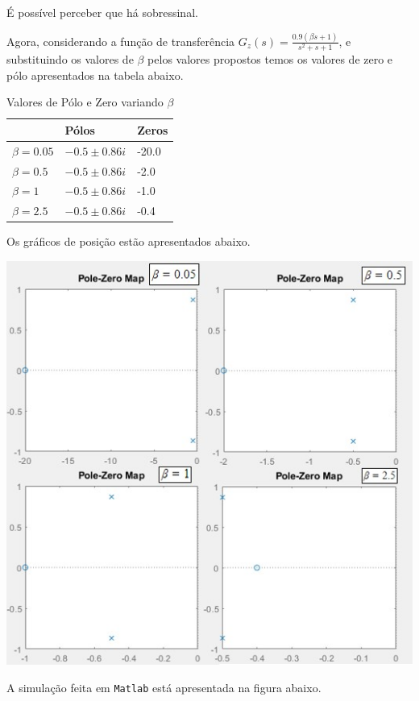 \documentclass[
]{book}
\begin{document}
É possível perceber que há sobressinal.

Agora, considerando a função de transferência \(G_z(s) = \frac {0.9(\beta s+1)}{s^2+s+1}\), e substituindo os valores de \(\beta\) pelos valores propostos temos os valores de zero e pólo apresentados na tabela abaixo.

\begin{table}

\caption{\label{tab:unnamed-chunk-7}Valores de Pólo e Zero variando $\beta$}
\centering
\begin{tabular}[t]{lll}
\toprule
  & Pólos & Zeros\\
\midrule
$\beta = 0.05$ & {$-0.5 \pm 0.86i$} & -20.0\\
$\beta = 0.5$ & {$-0.5 \pm 0.86i$} & -2.0\\
$\beta = 1$ & {$-0.5 \pm 0.86i$} & -1.0\\
$\beta = 2.5$ & {$-0.5 \pm 0.86i$} & -0.4\\
\bottomrule
\end{tabular}
\end{table}

Os gráficos de posição estão apresentados abaixo.

\includegraphics{Imagens/Lab2/prob5Varios.jpg}

A simulação feita em \texttt{Matlab} está apresentada na figura abaixo.
\end{document}
